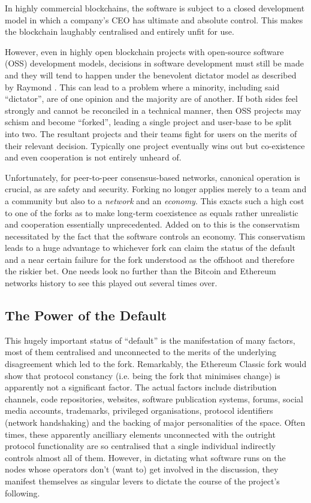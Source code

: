 \documentclass[9pt,oneside]{amsart}
\makeatletter
\newcommand*\ie{i.e.\@\xspace}
\makeatother
\begin{document}
In highly commercial blockchains, the software is subject to a closed development model in which a company's CEO has ultimate and absolute control. This makes the blockchain laughably centralised and entirely unfit for use.

However, even in highly open blockchain projects with open-source software (OSS) development models, decisions in software development must still be made and they will tend to happen under the benevolent dictator model as described by Raymond \cite{raymond1999cathedral}. This can lead to a problem where a minority, including said ``dictator'', are of one opinion and the majority are of another. If both sides feel strongly and cannot be reconciled in a technical manner, then OSS projects may schism and become ``forked'', leading a single project and user-base to be split into two. The resultant projects and their teams fight for users on the merits of their relevant decision. Typically one project eventually wins out but co-existence and even cooperation is not entirely unheard of.

Unfortunately, for peer-to-peer consensus-based networks, canonical operation is crucial, as are safety and security. Forking no longer applies merely to a team and a community but also to a \emph{network} and an \emph{economy}. This exacts such a high cost to one of the forks as to make long-term coexistence as equals rather unrealistic and cooperation essentially unprecedented. Added on to this is the conservatism necessitated by the fact that the software controls an economy. This conservatism leads to a huge advantage to whichever fork can claim the status of the default and a near certain failure for the fork understood as the offshoot and therefore the riskier bet. One needs look no further than the Bitcoin and Ethereum networks history to see this played out several times over.

\subsection{The Power of the Default}

This hugely important status of ``default'' is the manifestation of many factors, most of them centralised and unconnected to the merits of the underlying disagreement which led to the fork. Remarkably, the Ethereum Classic fork would show that protocol constancy (\ie being the fork that minimises change) is apparently not a significant factor. The actual factors include distribution channels, code repositories, websites, software publication systems, forums, social media accounts, trademarks, privileged organisations, protocol identifiers (network handshaking) and the backing of major personalities of the space. Often times, these apparently ancilliary elements unconnected with the outright protocol functionality are so centralised that a single individual indirectly controls almost all of them. However, in dictating what software runs on the nodes whose operators don't (want to) get involved in the discussion, they manifest themselves as singular levers to dictate the course of the project's following.
\end{document}
